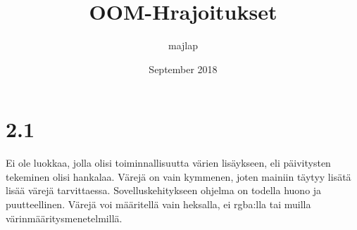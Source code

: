 \documentclass{article}
\title{OOM-Hrajoitukset}
\author{majlap }
\date{September 2018}
\begin{document}
\maketitle

\section{2.1}

Ei ole luokkaa, jolla olisi toiminnallisuutta värien lisäykseen, eli päivitysten tekeminen olisi hankalaa. Värejä on vain kymmenen, joten mainiin täytyy lisätä lisää värejä tarvittaessa. Sovelluskehitykseen ohjelma on todella huono ja puutteellinen. Värejä voi määritellä vain heksalla, ei rgba:lla tai muilla värinmääritysmenetelmillä. 
\end{document}
